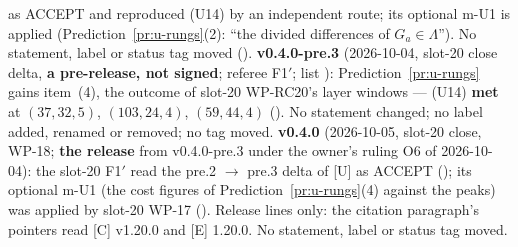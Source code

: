 \documentclass[11pt]{article}
\newcommand{\Iw}{\Lambda}                         %
\begin{document}
as ACCEPT and reproduced (U14) by an independent route; its optional m-U1 is applied (Prediction~\ref{pr:u-rungs}(2): ``the divided differences of $G_a\in\Iw$''). No statement, label or
status tag moved ().
\textbf{v0.4.0-pre.3} (2026-10-04, slot-20 close delta, \textbf{a pre-release, not signed}; referee F1$'$; list ): Prediction~\ref{pr:u-rungs}
gains item~(4), the outcome of slot-20 WP-RC20's layer windows --- (U14) \textbf{met} at $(37,32,5)$, $(103,24,4)$, $(59,44,4)$ (\COMP). No statement changed; no label added, renamed or
removed; no tag moved.
\textbf{v0.4.0} (2026-10-05, slot-20 close, WP-18; \textbf{the release} from v0.4.0-pre.3 under the owner's ruling O6 of 2026-10-04): the slot-20 F1$'$ read the pre.2 $\to$ pre.3 delta of [U]
as ACCEPT (); its optional m-U1 (the cost figures of Prediction~\ref{pr:u-rungs}(4) against the  peaks) was applied by slot-20
WP-17 (). Release lines only: the citation paragraph's pointers read [C] v1.20.0 and [E] 1.20.0. No statement, label or status tag moved.
\end{document}
